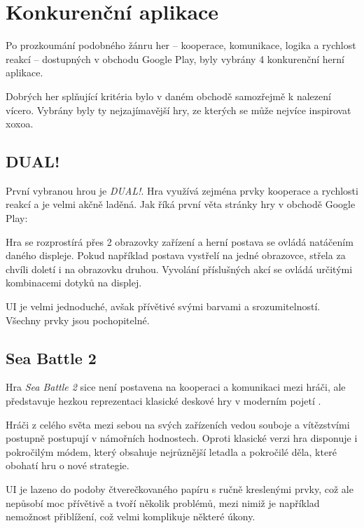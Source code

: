 \chapter{Konkurenční aplikace}


Po prozkoumání podobného žánru her
– kooperace, komunikace, logika a rychlost reakcí –
dostupných v obchodu Google Play, byly vybrány 4 konkurenční herní aplikace.

Dobrých her splňující kritéria bylo v daném obchodě samozřejmě k nalezení
vícero.
Vybrány byly ty nejzajímavější hry,
ze kterých se může \emph{\appName{}} nejvíce inspirovat xoxoa.

\section{DUAL!}

První vybranou hrou je \emph{DUAL!}.
Hra využívá zejména prvky kooperace a rychlosti reakcí a je velmi akčně laděná.
Jak říká první věta stránky hry \cite{seabaa_dual} v obchodě Google Play:

Hra se rozprostírá přes 2 obrazovky zařízení a herní postava se ovládá natáčením
daného displeje.
Pokud například postava vystřelí na jedné obrazovce,
střela za chvíli doletí i na obrazovku druhou.
Vyvolání příslušných akcí se ovládá určitými kombinacemi dotyků na displej.

UI je velmi jednoduché, avšak přívětivé svými barvami a srozumitelností.
Všechny prvky jsou pochopitelné.

\section{Sea Battle 2}

Hra \emph{Sea Battle 2} sice není postavena na kooperaci a komunikaci mezi
hráči,
ale představuje hezkou reprezentaci klasické deskové hry v moderním pojetí
\cite{henrysmithinc_spaceteam}.

Hráči z celého světa mezi sebou na svých zařízeních vedou souboje a vítězstvími
postupně postupují v námořních hodnostech.
Oproti klasické verzi hra disponuje i pokročilým módem,
který obsahuje nejrůznější letadla a pokročilé děla,
které obohatí hru o nové strategie.

UI je lazeno do podoby čtverečkovaného papíru s ručně kreslenými prvky,
což ale nepůsobí moc přívětivě a tvoří několik problémů,
mezi nimiž je například nemožnost přiblížení,
což velmi komplikuje některé úkony. 

